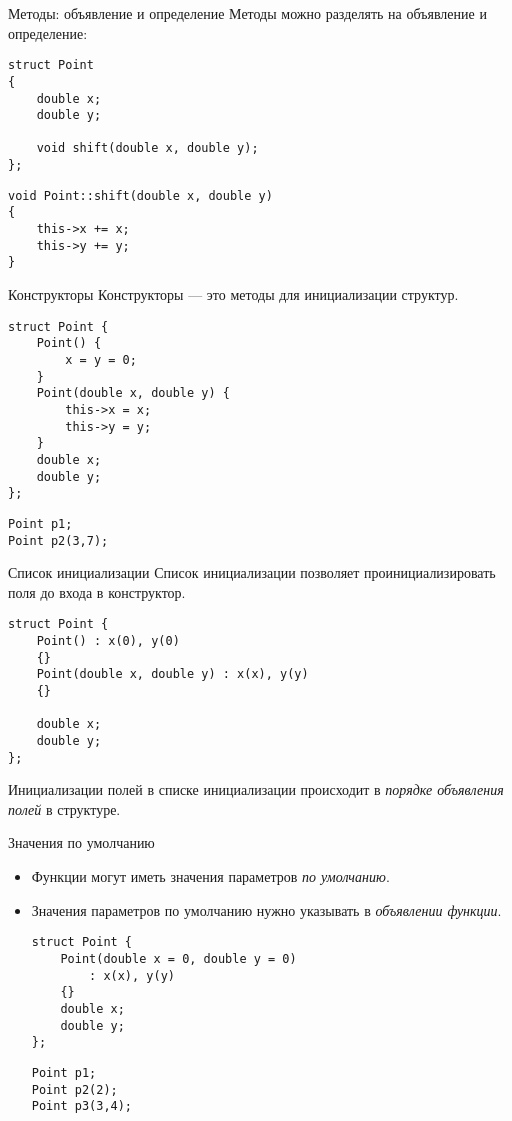 \documentclass{beamer}
\begin{document}
\begin{frame}[fragile]{Методы: объявление и определение}
    Методы можно разделять на объявление и определение:
    \begin{lstlisting}
struct Point 
{
    double x;
    double y;

    void shift(double x, double y);
};
    \end{lstlisting}

    \begin{lstlisting}
void Point::shift(double x, double y) 
{
    this->x += x;
    this->y += y;
}
    \end{lstlisting}
\end{frame}

\begin{frame}[fragile]{Конструкторы}
    Конструкторы — это методы для инициализации структур.
    \begin{lstlisting}
struct Point {
    Point() { 
        x = y = 0;
    }
    Point(double x, double y) {
        this->x = x;
        this->y = y;
    }
    double x;
    double y;
};
    \end{lstlisting}
    \begin{lstlisting}
Point p1;
Point p2(3,7);
    \end{lstlisting}
\end{frame}

\begin{frame}[fragile]{Список инициализации}
    Список инициализации позволяет проинициализировать поля до входа в
    конструктор.
    \begin{lstlisting}
struct Point {
    Point() : x(0), y(0) 
    {}
    Point(double x, double y) : x(x), y(y) 
    {}

    double x;
    double y;
};
    \end{lstlisting}
Инициализации полей в списке инициализации
происходит в {\em порядке объявления полей} в структуре.
\end{frame}

\begin{frame}[fragile]{Значения по умолчанию}
    \begin{itemize}
        \item Функции могут иметь значения параметров {\em по умолчанию}.
        \item Значения параметров по умолчанию нужно указывать в {\em объявлении
            функции}.
            \begin{lstlisting}
struct Point {
    Point(double x = 0, double y = 0) 
        : x(x), y(y)
    {}
    double x;
    double y;
};
            \end{lstlisting}
            \begin{lstlisting}
Point p1;
Point p2(2);
Point p3(3,4);
            \end{lstlisting}
    \end{itemize}
\end{frame}
\end{document}
